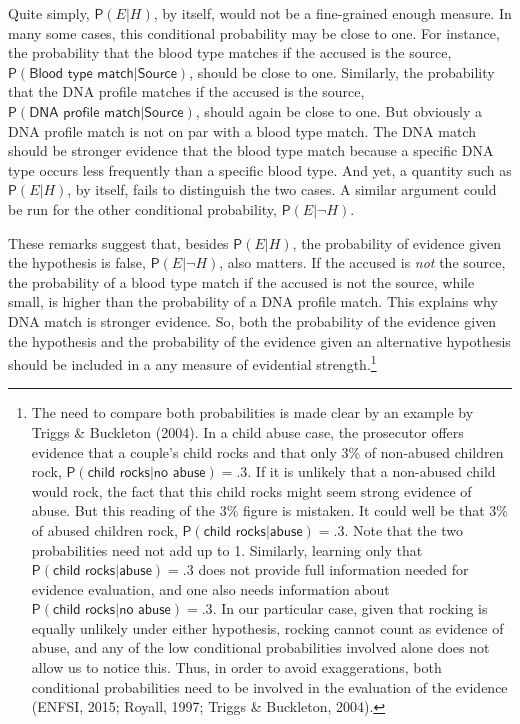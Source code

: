 \documentclass[
  10pt,
  dvipsnames,enabledeprecatedfontcommands]{scrartcl}
\newcommand{\pr}[1]{\mathsf{P}(#1)}
\begin{document}
Quite simply, \(\pr{E \vert H}\), by itself, would not be a fine-grained
enough measure. In many some cases, this conditional probability may be
close to one. For instance, the probability that the blood type matches
if the accused is the source,
\(\pr{\textsf{Blood type match} \vert \textsf{Source}}\), should be
close to one. Similarly, the probability that the DNA profile matches if
the accused is the source,
\(\pr{\textsf{DNA profile match} \vert \textsf{Source}}\), should again
be close to one. But obviously a DNA profile match is not on par with a
blood type match. The DNA match should be stronger evidence that the
blood type match because a specific DNA type occurs less frequently than
a specific blood type. And yet, a quantity such as \(\pr{E \vert H}\),
by itself, fails to distinguish the two cases. A similar argument could
be run for the other conditional probability, \(\pr{E \vert \neg H}\).

These remarks suggest that, besides \(\pr{E \vert H}\), the probability
of evidence given the hypothesis is false, \(\pr{E \vert \neg H}\), also
matters. If the accused is \textit{not} the source, the probability of a
blood type match if the accused is not the source, while small, is
higher than the probability of a DNA profile match. This explains why
DNA match is stronger evidence. So, both the probability of the evidence
given the hypothesis and the probability of the evidence given an
alternative hypothesis should be included in a any measure of evidential
strength.\footnote{The need to compare both probabilities is made clear
  by an example by Triggs \& Buckleton (2004). In a child abuse case,
  the prosecutor offers \label{text:rock} evidence that a couple's child
  rocks and that only 3\% of non-abused children rock,
  \(\pr{\textsf{child rocks} \vert \textsf{no abuse}}=.3\). If it is
  unlikely that a non-abused child would rock, the fact that this child
  rocks might seem strong evidence of abuse. But this reading of the 3\%
  figure is mistaken. It could well be that 3\% of abused children rock,
  \(\pr{\textsf{child rocks} \vert \textsf{abuse}}=.3\). Note that the
  two probabilities need not add up to 1. Similarly, learning only that
  \(\pr{\textsf{child rocks} \vert \textsf{abuse}}=.3\) does not provide
  full information needed for evidence evaluation, and one also needs
  information about
  \(\pr{\textsf{child rocks} \vert \textsf{no abuse}}=.3\). In our
  particular case, given that rocking is equally unlikely under either
  hypothesis, rocking cannot count as evidence of abuse, and any of the
  low conditional probabilities involved alone does not allow us to
  notice this. Thus, in order to avoid exaggerations, both conditional
  probabilities need to be involved in the evaluation of the evidence
  (ENFSI, 2015; Royall, 1997; Triggs \& Buckleton, 2004).}
\end{document}
